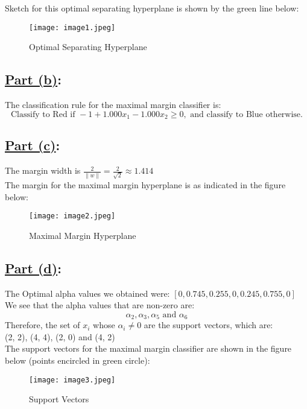 \documentclass[12pt]{article}
\begin{document}
Sketch for this optimal separating hyperplane is shown by the green line below:
\begin{figure}[h!] %
  \centering %
  \texttt{[image: image1.jpeg]} %
  \caption{Optimal Separating Hyperplane} %
  \label{fig:your_label} %
\end{figure}

\subsection*{\underline{Part (b)}:}
The classification rule for the maximal margin classifier is:
\[
  \text{Classify to Red if } -1 + 1.000x_1 - 1.000x_2 \geq 0, \text{ and classify to Blue otherwise.}
\]

\subsection*{\underline{Part (c)}:}
The margin width is \(\frac{2}{\|w\|} = \frac{2}{\sqrt{2}} \approx 1.414\)\\
The margin for the maximal margin hyperplane is as indicated in the figure below:
\begin{figure}[h!] %
  \centering %
  \texttt{[image: image2.jpeg]} %
  \caption{Maximal Margin Hyperplane} %
  \label{fig:your_label} %
\end{figure}

\subsection*{\underline{Part (d)}:}
The Optimal alpha values we obtained were: $[0, 0.745,  0.255, 0, 0.245, 0.755, 0]$\\
We see that the alpha values that are non-zero are:
\[\alpha_2, \alpha_3, \alpha_5 \text{ and } \alpha_6\]
Therefore, the set of $x_i$ whose $\alpha_i \neq 0$ are the support vectors, which are:\\
(2, 2), (4, 4), (2, 0) and (4, 2)\\
The support vectors for the maximal margin classifier are shown in the figure below (points encircled in green circle):
\begin{figure}[h!] %
  \centering %
  \texttt{[image: image3.jpeg]} %
  \caption{Support Vectors} %
  \label{fig:your_label} %
\end{figure}
\end{document}
